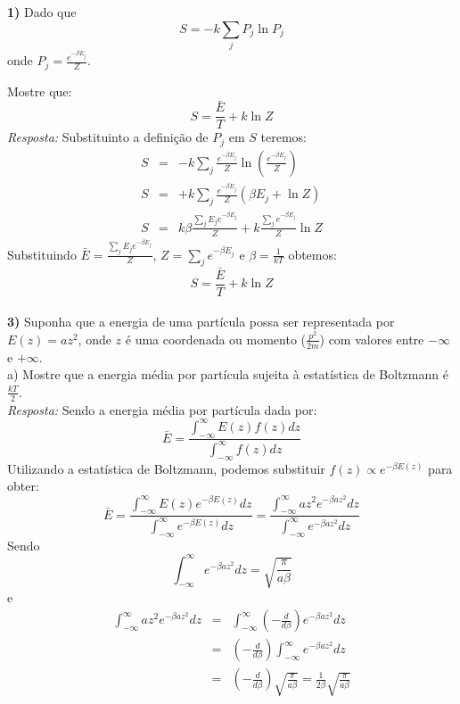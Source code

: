 \documentclass[11pt,leqno]{article}
\begin{document}
\noindent
{\bf 1)} Dado que
\begin{equation}
S=-k \sum_{j} P_{j} \ln P_{j}
\nonumber
\end{equation}
onde $P_{j}= \frac{e^{-\beta E_{j}}}{Z}$.

Mostre que:
\begin{equation}
S=\frac{\bar{E}}{T}+k \ln Z
\nonumber
\end{equation}
{\it Resposta:} Substituinto a definição de $P_{j}$ em $S$ teremos:
\begin{eqnarray}
S&=& -k \sum_{j} \frac{e^{-\beta E_{j}}}{Z} \ln \left( \frac{e^{-\beta E_{j}}}{Z} \right)
\nonumber \\
S&=& +k \sum_{j} \frac{e^{-\beta E_{j}}}{Z} (\beta E_{j} + \ln Z) \nonumber \\
S&=& k \beta \frac{ \sum_{j} E_{j} e^{-\beta E_{j}}}{Z} + k \frac{\sum_{j} e^{-\beta E_{j}}}{Z}\ln Z \nonumber
\end{eqnarray}
Substituindo $\bar{E}=\frac{\sum_{j} E_{j} e^{-\beta E_{j}}}{Z}$, $Z=\sum_{j} e^{-\beta E_{j}}$ e $\beta=\frac{1}{kT}$ obtemos:
\begin{equation}
S=\frac{\bar{E}}{T}  + k \ln Z
\nonumber
\end{equation}
\\
\noindent
{\bf 3)} Suponha que a energia de uma partícula possa ser representada por $E(z) = a z^{2}$, onde $z$ é uma coordenada ou momento ($\frac{p^{2}}{2m}$) com valores entre $-\infty$ e $+\infty$.\\
a) Mostre que a energia média por partícula sujeita à estatística de Boltzmann é $\frac{kT}{2}$.\\
{\it Resposta:} Sendo a energia média por partícula dada por:
\begin{equation}
\bar{E}=\frac{\int_{-\infty}^{\infty} E(z) f(z) dz}{\int_{-\infty}^{\infty} f(z) dz}
\nonumber
\end{equation}
Utilizando a estatística de Boltzmann, podemos substituir $f(z)\propto e^{-\beta E(z)}$ para obter:
\begin{equation}
\bar{E}=\frac{\int_{-\infty}^{\infty} E(z) e^{-\beta E(z)} dz}{\int_{-\infty}^{\infty} e^{-\beta E(z)} dz}=\frac{\int_{-\infty}^{\infty}  a z^{2} e^{-\beta a z^{2}} dz}{\int_{-\infty}^{\infty} e^{-\beta a z^{2}} dz}
\nonumber
\end{equation}
Sendo
\begin{equation}
\int_{-\infty}^{\infty} e^{-\beta a z^{2}} dz=\sqrt{\frac{\pi}{a \beta}}
\nonumber
\end{equation}
e
\begin{eqnarray}
\int_{-\infty}^{\infty} a z^{2} e^{-\beta a z^{2}} dz&=&\int_{-\infty}^{\infty} \left( -\frac{d}{d\beta} \right) e^{-\beta a z^{2}} dz\nonumber \\&=&\left( -\frac{d}{d\beta} \right) \int_{-\infty}^{\infty} e^{-\beta a z^{2}} dz\nonumber \\&=&\left( -\frac{d}{d\beta} \right) \sqrt{\frac{\pi}{a \beta}}=\frac{1}{2\beta} \sqrt{\frac{\pi}{a \beta}}
\nonumber
\end{eqnarray}
\end{document}
